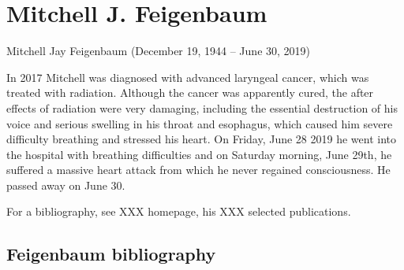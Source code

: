 
\chapter{Mitchell J. Feigenbaum}
\label{c-Feigenbaum}

Mitchell Jay Feigenbaum (December 19, 1944 -- June 30, 2019)

In 2017 Mitchell was diagnosed with advanced laryngeal cancer, which was
treated with radiation. Although the cancer was apparently cured, the
after effects of radiation were very damaging, including the essential
destruction of his voice and serious swelling in his throat and
esophagus, which caused him severe difficulty breathing and stressed his
heart. On Friday, June 28 2019 he went into the hospital with breathing
difficulties and on Saturday morning, June 29th, he suffered a massive
heart attack from which he never regained consciousness. He passed away
on June 30.

For a bibliography, see
{XXX} homepage,
his
{XXX selected publications}.

\section{Feigenbaum bibliography}
\label{sect:Feigenbaum}

